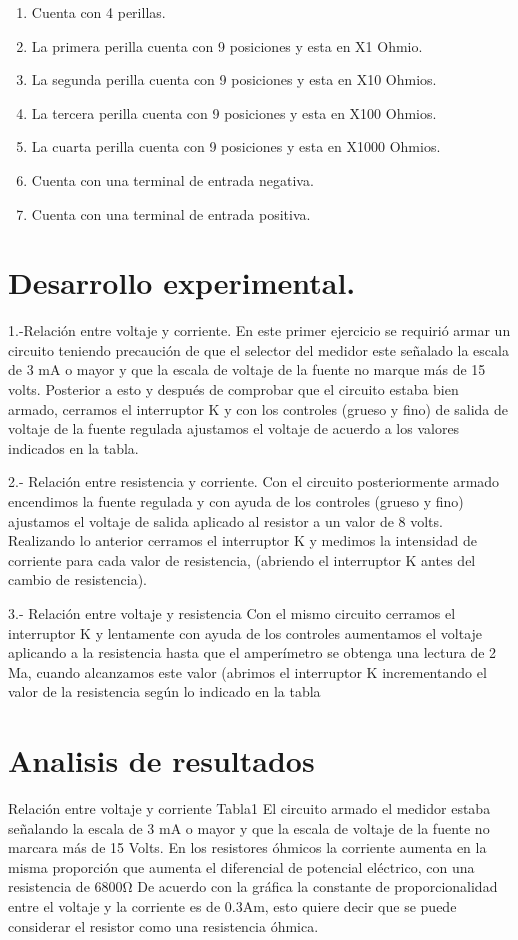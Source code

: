 \documentclass[10pt]{article}
\begin{document}
\begin{multicols}{2}
\begin{center}
\begin{enumerate}
\item Cuenta con 4 perillas.
\item La primera perilla cuenta con 9 posiciones y esta en X1 Ohmio.
\item La segunda perilla cuenta con 9 posiciones y esta en X10 Ohmios.
\item La tercera perilla cuenta con 9 posiciones y esta en X100 Ohmios.
\item La cuarta perilla cuenta con 9 posiciones y esta en X1000 Ohmios.
\item Cuenta con una terminal de entrada negativa.
\item Cuenta con una terminal de entrada positiva.
\end{enumerate}
\end{center}


\section{Desarrollo experimental.}

1.-Relación entre voltaje y corriente. 
En este primer ejercicio se requirió armar un circuito teniendo precaución de que el selector del medidor este señalado la escala de 3 mA  o mayor y que la escala de voltaje de la fuente no marque más de 15 volts. 
Posterior a esto y después de comprobar que el circuito estaba bien armado, cerramos el interruptor K y con los controles (grueso y fino) de salida de voltaje de la fuente regulada ajustamos el voltaje de acuerdo a los valores indicados en la tabla.
 
2.- Relación entre resistencia y corriente. 
Con el circuito posteriormente armado encendimos la fuente regulada y con ayuda de los controles (grueso y fino) ajustamos el voltaje de salida aplicado al resistor a un valor de 8 volts. 
Realizando lo anterior cerramos el interruptor K y medimos la intensidad de corriente para cada valor de resistencia, (abriendo el interruptor K antes del cambio de resistencia). 

3.- Relación entre voltaje y resistencia 
Con el mismo circuito cerramos el interruptor K y lentamente con ayuda de los controles aumentamos el voltaje aplicando a la resistencia hasta que el amperímetro se obtenga una lectura de 2 Ma, cuando alcanzamos este valor (abrimos el interruptor K incrementando el valor de la resistencia según lo indicado en la tabla



\section{Analisis de resultados}
Relación entre voltaje y corriente 
Tabla1 
El circuito armado el medidor estaba señalando la escala de 3 mA o mayor y que la escala de voltaje de la fuente no marcara más de 15 Volts. 
En los resistores óhmicos la corriente aumenta en la misma proporción que aumenta el diferencial de potencial eléctrico, con una resistencia de 6800Ω
De acuerdo con la gráfica la constante de proporcionalidad entre el voltaje y la corriente es de 0.3Am, esto quiere decir que se puede considerar el resistor como una resistencia óhmica. 


\end{multicols}
\end{document}
